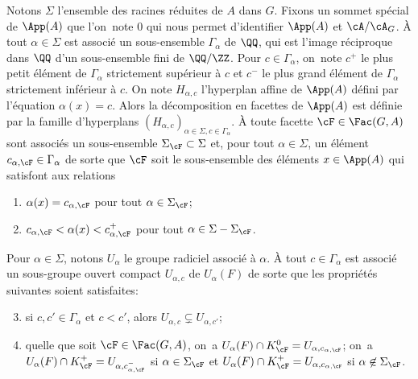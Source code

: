 Notons $\Sigma$ l'ensemble des racines réduites de $A$ dans $G$. Fixons un sommet spécial de $\App(A)$ que l'on~note $0$ qui nous permet d'identifier $\App(A)$ et $\cA/\cA_{G}$. À tout $\alpha\in \Sigma$ est associé un sous-ensemble $\Gamma_{\alpha}$ de $\QQ$, qui est l'image réciproque dans $\QQ$ d'un sous-ensemble fini de $\QQ/\ZZ$. Pour $c\in \Gamma_{\alpha}$, on~note $c^+$ le plus petit élément de $\Gamma_{\alpha}$ strictement supérieur à $c$ et $c^-$ le plus grand élément de $\Gamma_{\alpha}$ strictement inférieur à $c$. On note $H_{\alpha,c}$ l'hyperplan affine de $\App(A)$ défini par l'équation $\alpha(x)=c$. Alors la décomposition en facettes de $\App(A)$ est définie par la famille d'hyperplans $(H_{\alpha,c})_{\alpha\in \Sigma, c\in \Gamma_{\alpha}}$. À toute facette $\cF\in \Fac(G,A)$ sont associés un sous-ensemble $\Sigma_{\cF}\subset \Sigma$ et, pour tout $\alpha\in \Sigma$, un élément $c_{\alpha,\cF}\in \Gamma_{\alpha}$ de sorte que $\cF$ soit le sous-ensemble des éléments $x\in \App(A)$ qui satisfont aux relations
\begin{enumerate}
\item\label{description1}
$\alpha(x)=c_{\alpha,\cF}$ pour tout $\alpha\in \Sigma_{\cF}$;

\item\label{description2}
$c_{\alpha,\cF}<\alpha(x)<c_{\alpha,\cF}^+$ pour tout $\alpha\in \Sigma-\Sigma_{\cF}$.
\end{enumerate}

Pour $\alpha\in \Sigma$, notons $U_{\alpha}$ le groupe radiciel associé à $\alpha$. À tout $c\in \Gamma_{\alpha}$ est associé un sous-groupe ouvert compact $U_{\alpha,c}$ de $U_{\alpha}(F)$ de sorte que les propriétés suivantes soient satisfaites:

\begin{enumerate}\setcounter{enumi}{2}
\item\label{description3}
si $c,c'\in \Gamma_{\alpha}$ et $c<c'$, alors $U_{\alpha,c}\subsetneq U_{\alpha,c'}$;

\item\label{description4}
quelle que soit $\cF\in \Fac(G,A)$, on~a $U_{\alpha}(F)\cap K_{\cF}^0=U_{\alpha,c_{\alpha,\cF}}$; on~a $U_{\alpha}(F)\cap K_{\cF}^+=U_{\alpha,c_{\alpha,\cF}^-}$ si $\alpha\in \Sigma_{\cF}$ et $U_{\alpha}(F)\cap K_{\cF}^+=U_{\alpha,c_{\alpha,\cF}}$ si $\alpha\not \in \Sigma_{\cF}$.
\end{enumerate}

